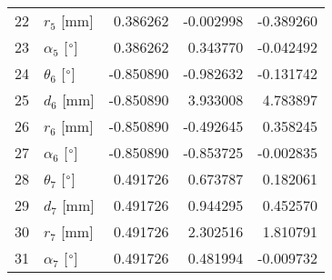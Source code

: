 \documentclass{standalone}%
\begin{document}
\begin{tabular}{llrrr}
22 &              $r_{5}$ [mm] &  0.386262 &  -0.002998 &  -0.389260 \\
23 &  $\alpha_{5}$ [$\degree$] &  0.386262 &   0.343770 &  -0.042492 \\
24 &  $\theta_{6}$ [$\degree$] & -0.850890 &  -0.982632 &  -0.131742 \\
25 &              $d_{6}$ [mm] & -0.850890 &   3.933008 &   4.783897 \\
26 &              $r_{6}$ [mm] & -0.850890 &  -0.492645 &   0.358245 \\
27 &  $\alpha_{6}$ [$\degree$] & -0.850890 &  -0.853725 &  -0.002835 \\
28 &  $\theta_{7}$ [$\degree$] &  0.491726 &   0.673787 &   0.182061 \\
29 &              $d_{7}$ [mm] &  0.491726 &   0.944295 &   0.452570 \\
30 &              $r_{7}$ [mm] &  0.491726 &   2.302516 &   1.810791 \\
31 &  $\alpha_{7}$ [$\degree$] &  0.491726 &   0.481994 &  -0.009732 \\
\bottomrule
\end{tabular}
%
\end{document}
